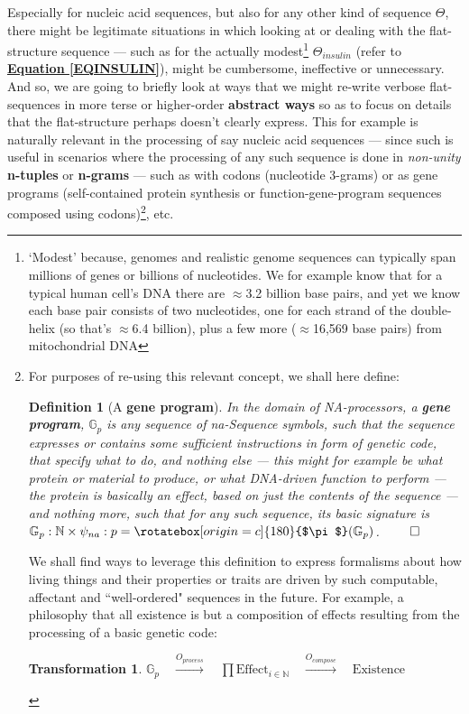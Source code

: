 \documentclass[a4paper, 18pt]{book} %
\newtheorem{defn}{Definition}
\newtheorem{trans}{Transformation}
\newcommand{\invpi}{\rotatebox[origin=c]{180}{$\pi$}}
\begin{document}
Especially for nucleic acid sequences, but also for any other kind of sequence $\Theta$, there might be legitimate situations in which looking at or dealing with the flat-structure sequence --- such as for the actually modest\footnote{`Modest' because, genomes and realistic genome sequences can typically span millions of genes or billions of nucleotides. We for example know that for a typical human cell's DNA there are $\approx$3.2 billion base pairs\cite{Venter2001}, and yet we know each base pair consists of two nucleotides, one for each strand of the double-helix (so that's $\approx$6.4 billion), plus a few more ($\approx$16,569 base pairs) from mitochondrial DNA\cite{Anderson1981}} $\Theta_{insulin}$ (refer to \textbf{\hyperref[EQINSULIN]{Equation \ref{EQINSULIN}}}), might be cumbersome, ineffective or unnecessary. And so, we are going to briefly look at ways that we might re-write verbose flat-sequences in more terse or higher-order \textbf{abstract ways} so as to focus on details that the flat-structure perhaps doesn't clearly express. This for example is naturally relevant in the processing of say nucleic acid sequences --- since such is useful in scenarios where the processing of any such sequence is done in \textit{non-unity} \textbf{n-tuples} or \textbf{n-grams} --- such as with codons (nucleotide 3-grams) or as gene programs (self-contained protein synthesis or function-gene-program sequences composed using codons)\footnote{
For purposes of re-using this relevant concept, we shall here define: 

\begin{defn}[A \textbf{gene program}]
\label{DEFGENPROG}
 In the domain of NA-processors, a \textbf{gene program}, $\mathbb{G}_{p}$ is any sequence of na-Sequence symbols, such that the sequence expresses or contains some sufficient instructions in form of genetic code, that specify what to do, and nothing else --- this might for example be what protein or material to produce, or what DNA-driven function to perform --- the protein is basically an effect, based on just the contents of the sequence --- and nothing more, such that for any such sequence, its basic signature is $\mathbb{G}_{p}: \mathbb{N} \times \psi_{na}:p=\invpi(\mathbb{G}_{p})$.
$\qed$
\end{defn} We shall find ways to leverage this definition to express formalisms about how living things and their properties or traits are driven by such computable, affectant and ``well-ordered" sequences in the future. For example, a philosophy that all existence is but a composition of effects resulting from the processing of a basic genetic code:

\begin{trans}
\label{TRANSTOENASEQ}
$\mathbb{G}_{p}  \quad \xrightarrow{O_{process}} \quad \prod \text{Effect}_{i \in \mathbb{N}}  \quad \xrightarrow{O_{compose}}  \quad \text{Existence}$
\end{trans}

}, etc.
\end{document}
